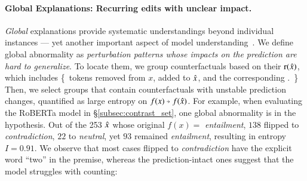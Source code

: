 \paragraph{Global Explanations: Recurring edits with unclear impact.}
\label{subsec:global_exp}
\emph{Global} explanations provide systematic understandings beyond individual instances --- yet another important aspect of model understanding~\cite{miller}.
We define global abnormality as \emph{perturbation patterns whose impacts on the prediction are hard to generalize}.
To locate them, we group counterfactuals based on their $\operatorname*{r}(\hat{x})$, which includes 
\{\ tokens removed from $x$, added to $\hat{x}$, and the corresponding \tagstr.\ \}
Then, we select groups that contain counterfactuals with unstable prediction changes, quantified as large entropy on $f(x) \veryshortarrow f(\xp)$.
For example, when evaluating the \nli RoBERTa model in \S\ref{subsec:contrast_set}, one global abnormality is  in the hypothesis.
Out of the 253 $\hat{x}$ whose original $f(x)=$ \emph{entailment}, $138$ flipped to \emph{contradiction}, $22$ to \emph{neutral}, yet $93$ remained \emph{entailment}, resulting in entropy $I=0.91$.
We observe that most cases flipped to \emph{contradiction} have the explicit word ``two'' in the premise, whereas the prediction-intact ones suggest that the model struggles with counting:


